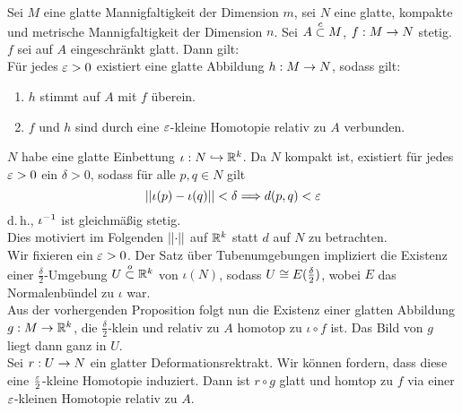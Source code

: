 Sei $M$ eine glatte Mannigfaltigkeit der Dimension $m$, sei $N$ eine glatte, kompakte und metrische Mannigfaltigkeit der Dimension $n$. Sei $A\overset{c}{\subset} M$, $f : M\overset{}{\rightarrow} N$ stetig. $f$ sei auf $A$ eingeschränkt glatt. Dann gilt:\\
Für jedes $\varepsilon > 0$ existiert eine glatte Abbildung $h : M \overset{}{\rightarrow} N$, sodass gilt:
\begin{enumerate}
	\item $h$ stimmt auf $A$ mit $f$ überein.
	\item $f$ und $h$ sind durch eine $\varepsilon$-kleine Homotopie relativ zu $A$ verbunden.
\end{enumerate}
\begin{Beweis}{}
$N$ habe eine glatte Einbettung $\iota : N \overset{}{\hookrightarrow} \mathbb{R}^k$. Da $N$ kompakt ist, existiert für jedes $\varepsilon > 0$ ein $\delta > 0$, sodass für alle $p,q \in N$ gilt
\[ \left|\left|\iota(p)- \iota(q)\right|\right| < \delta \overset{}{\Longrightarrow} d(p,q) < \varepsilon \]
d.\,h., $\iota^{-1}$ ist gleichmäßig stetig.\\
Dies motiviert im Folgenden $\left|\left|\cdot\right|\right|$ auf $\mathbb{R}^k$ statt $d$ auf $N$ zu betrachten.\\
Wir fixieren ein $\varepsilon > 0$. Der Satz über Tubenumgebungen impliziert die Existenz einer $\frac{\delta}{2}$-Umgebung $U \overset{o}{\subset} \mathbb{R}^k$ von $\iota(N)$, sodass $U \overset{}{\cong} E(\frac{\delta}{2})$, wobei $E$ das Normalenbündel zu $\iota$ war.\\
Aus der vorhergenden Proposition folgt nun die Existenz einer glatten Abbildung $g : M\overset{}{\rightarrow} \mathbb{R}^k$, die $\frac{\delta}{2}$-klein und relativ zu $A$ homotop zu $\iota \circ f$ ist. Das Bild von $g$ liegt dann ganz in $U$.\\
Sei $r : U \overset{}{\rightarrow} N$ ein glatter Deformationsrektrakt. Wir können fordern, dass diese eine $\frac{\varepsilon}{2}$-kleine Homotopie induziert. Dann ist $r \circ g$ glatt und homtop zu $f$ via einer $\varepsilon$-kleinen Homotopie relativ zu $A$.
\end{Beweis}

